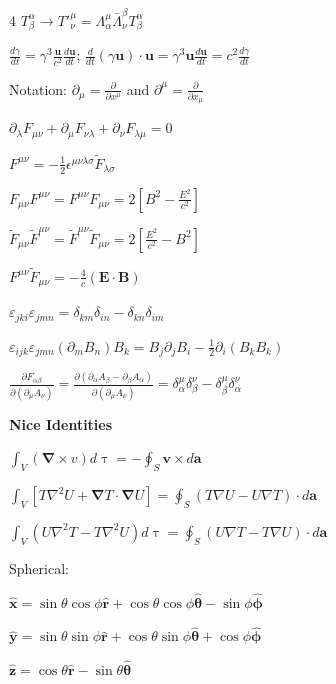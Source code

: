 \documentclass[a4paper,twoside]{article}
\newcommand{\secblock}[1]{%
\par\vspace{1.8pt}%
\noindent\colorbox{hdrcol}{\parbox[c][1.0em][c]{0.98\linewidth}{\color{white}\bfseries\small #1}}\par
\vspace{1pt}%
}
\begin{document}
\begin{multicols*}{4}
\(T^\alpha_\beta \to T'^\mu_\nu = \Lambda^\mu_\alpha \bar{\Lambda}_\nu^\beta T^{\alpha}_{\beta}\)

\(\frac{d \gamma}{d t} =\gamma^3 \frac{\bm u}{c^2} \frac{d \bm u}{dt}\);
\(
\frac{d}{dt} (\gamma \bm u) \cdot \bm u = \gamma^3 \bm u \frac{d \bm u}{dt} = c^2 \frac{d\gamma}{dt} \)

Notation: \(\partial_\mu = \frac{\partial}{\partial x^\mu}\) and \(\partial^\mu = \frac{\partial}{\partial x_\mu}\)


\(\partial_\lambda F_{\mu\nu} + \partial_\mu F_{\nu\lambda} + \partial_\nu F_{\lambda\mu} = 0 \)

\(F^{\mu\nu} = - \frac{1}{2} \epsilon^{\mu\nu\lambda\sigma} \tilde{F}_{\lambda\sigma} \)

\(F_{\mu \nu} F^{\mu \nu} = F^{\mu \nu} F_{\mu \nu}  = 2[ B^2 - \frac{E^2}{c^2} ]\)

\(\tilde{F}_{\mu \nu} \tilde{F}^{\mu \nu} = \tilde{F}^{\mu \nu} \tilde{F}_{\mu \nu}  = 2[ \frac{E^2}{c^2} - B^2]\)

\(F^{\mu \nu } \tilde{F}_{\mu \nu} = -\frac{4}{c}(\bm E \cdot \bm B)\)

\(\varepsilon_{jki}\varepsilon_{jmn} = \delta_{km}\delta_{in} - \delta_{kn}\delta_{im}\)

\(\varepsilon_{ijk}\varepsilon_{jmn}(\partial_m B_n)B_k = B_j\partial_j B_i - \tfrac{1}{2}\partial_i(B_k B_k)\)

\(\frac{\partial F_{\alpha\beta}}{\partial(\partial_\mu A_\nu)} = \frac{\partial(\partial_\alpha A_\beta - \partial_\beta A_\alpha)}{\partial(\partial_\mu A_\nu)} = \delta^\mu_\alpha \delta^\nu_\beta - \delta^\mu_\beta \delta^\nu_\alpha\)



\secblock{Nice Identities}
\(\int_V (\bm \nabla \times v) d \uptau = - \oint_S \bm v \times d \bm a\)

\(\int_V [T \nabla^2 U + \bm \nabla T \cdot \bm \nabla U] = \oint_S (T \nabla U - U \nabla T) \cdot d \bm a\)

\(\int_V (U \nabla^2 T - T \nabla^2 U) d \uptau = \oint_S (U \nabla T - T \nabla U) \cdot d \bm a\)

Spherical:

\(\hat{\bm x} = \sin \theta \cos \phi \hat{\bm r} + \cos \theta \cos \phi \hat{\bm \theta}-\sin \phi \hat{\bm \phi}\)

\(\hat{\bm y} = \sin\theta \sin \phi \hat{\bm r} + \cos\theta \sin \phi \hat{\bm \theta} + \cos \phi \hat{\bm \phi}\)

\(\hat{\bm z} = \cos \theta \hat{\bm r} - \sin \theta \hat{\bm \theta}\)


\end{multicols*}
\end{document}
